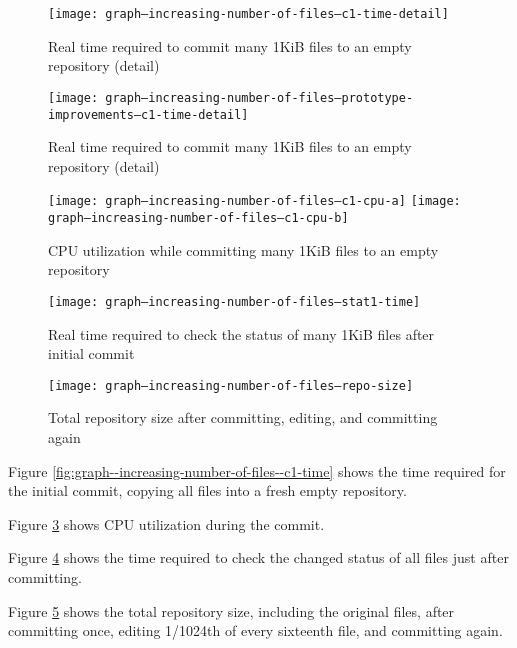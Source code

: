 \documentclass[a4paper]{article}
\begin{document}
\begin{figure}[p]
  \caption{Real time required to commit many 1KiB files to an empty repository
  (detail)}
  \label{fig:graph--increasing-number-of-files--c1-time-detail}
  \centering
    \texttt{[image: graph--increasing-number-of-files--c1-time-detail]}
\end{figure}

\begin{figure}[p]
  \caption{Real time required to commit many 1KiB files to an empty repository
  (detail)}
  \label{fig:graph--increasing-number-of-files--prototype-improvements--c1-time-detail}
  \centering
    \texttt{[image: graph--increasing-number-of-files--prototype-improvements--c1-time-detail]}
\end{figure}

\begin{figure}[p]
  \caption{CPU utilization while committing many 1KiB files to an empty
  repository}
  \label{fig:graph--increasing-number-of-files--c1-cpu}
  \centering
    \texttt{[image: graph--increasing-number-of-files--c1-cpu-a]}
    \texttt{[image: graph--increasing-number-of-files--c1-cpu-b]}
\end{figure}

\begin{figure}[p]
  \caption{Real time required to check the status of many 1KiB files after
  initial commit}
  \label{fig:graph--increasing-number-of-files--stat1-time}
  \centering
    \texttt{[image: graph--increasing-number-of-files--stat1-time]}
\end{figure}

\begin{figure}[p]
  \caption{Total repository size after committing, editing, and committing again}
  \label{fig:graph--increasing-number-of-files--repo-size}
  \centering
    \texttt{[image: graph--increasing-number-of-files--repo-size]}
\end{figure}

Figure \ref{fig:graph--increasing-number-of-files--c1-time} shows the time
required for the initial commit, copying all files into a fresh empty
repository.

Figure \ref{fig:graph--increasing-number-of-files--c1-cpu} shows CPU utilization
during the commit.

Figure \ref{fig:graph--increasing-number-of-files--stat1-time} shows the time
required to check the changed status of all files just after committing.

Figure \ref{fig:graph--increasing-number-of-files--repo-size} shows the total
repository size, including the original files, after committing once, editing
1/1024th of every sixteenth file, and committing again.
\end{document}
